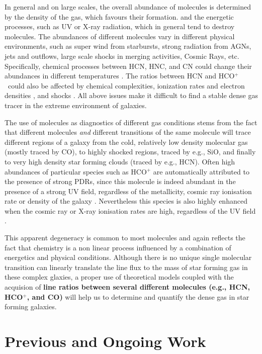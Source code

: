 \documentclass[legal,11pt]{article}
\def\HCOP       {HCO$^{+}$}
\begin{document}
In general and on large scales, the overall abundance of molecules is
determined by the density of the gas, which favours their formation. and the
energetic processes, such as UV or X-ray radiation,  which in general tend to
destroy molecules.  The abundances of different molecules vary in different
physical environments, such as super wind from starbursts, strong radiation
from AGNs, jets and outflows, large scale shocks in merging activities, Cosmic
Rays, etc. Specifically, chemical processes between HCN, HNC, and CN could
change their abundances in different temperatures \citep{Baan08}. The ratios
between HCN and \HCOP\ could also be affected by chemical
complexities\citep[e.g.,][]{krips08}, ionization rates and electron densities
\citep[e.g.][]{PPP2007}, and shocks \citep[e.g.,][]{Xie95}. All above issues
make it difficult to find a stable dense gas tracer in the extreme environment
of galaxies. 



The use of molecules as diagnostics of different gas conditions stems from the
fact that different molecules {\it and} different transitions of the same
molecule will trace different regions of a galaxy from the cold, relatively low
density molecular gas (mostly traced by CO), to highly shocked regions, traced
by e.g., SiO, and finally to very high density star forming clouds (traced by
e.g., HCN). Often high abundances of particular species such as HCO$^+$ are
automatically attributed to the presence of strong PDRs, since this molecule is
indeed abundant in the presence of a strong UV field, regardless of the
metallicity, cosmic ray ionisation rate or density of the galaxy
\citep[e.g.,][]{Bayet2011}. Nevertheless this species is also highly enhanced
when the cosmic ray or X-ray ionisation rates are high, regardless of the UV
field \citep[e.g.,][]{Bayet2011,Meijerink2005,Meijerink07}. 

This apparent degeneracy is common to most molecules and again reflects the
fact that chemistry is a non linear process influenced by a combination of
energetics and physical conditions. Although there is no unique single
molecular transition can linearly translate the line flux to the mass of star
forming gas in these complex glaxies, a proper use of theoretical models
coupled with the acquision of {\bf line ratios between several different
molecules (e.g., HCN, \HCOP, and CO) } will help us to determine and quantify
the dense gas in star forming galaxies. 

\section{Previous and Ongoing Work}
\end{document}
